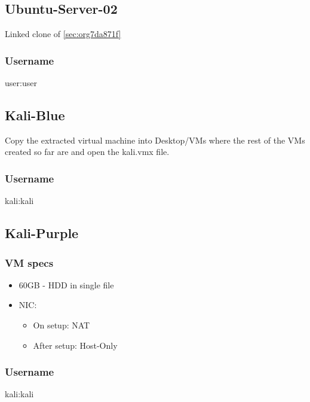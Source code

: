 \documentclass[11pt]{article}
\begin{document}
\subsection{Ubuntu-Server-02}
\label{sec:org645ab7f}
Linked clone of \ref{sec:org7da871f}
\subsubsection{Username}
\label{sec:org1dd6273}
user:user
\subsection{Kali-Blue}
\label{sec:org6fa65d3}
Copy the extracted virtual machine into Desktop/VMs where the rest of the VMs created so far are and open the kali.vmx file.
\subsubsection{Username}
\label{sec:orga01ccca}
kali:kali
\subsection{Kali-Purple}
\label{sec:org71ee4ba}
\subsubsection{VM specs}
\label{sec:org0214a3c}
\begin{itemize}
\item 60GB - HDD in single file
\item NIC:
\begin{itemize}
\item On setup: NAT
\item After setup: Host-Only
\end{itemize}
\end{itemize}
\subsubsection{Username}
\label{sec:org38818b7}
kali:kali
\end{document}
